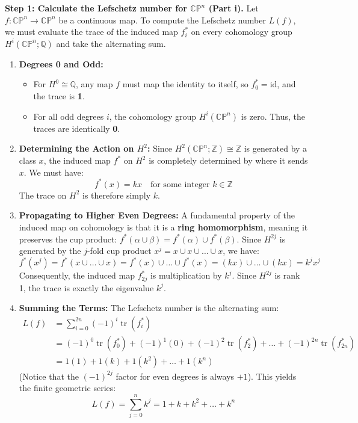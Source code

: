 \begin{solution}
\textbf{Step 1: Calculate the Lefschetz number for $\mathbb{CP}^n$ (Part i).}
Let $f: \mathbb{CP}^n \to \mathbb{CP}^n$ be a continuous map. To compute the Lefschetz number $L(f)$, we must evaluate the trace of the induced map $f^*_i$ on every cohomology group $H^i(\mathbb{CP}^n; \mathbb{Q})$ and take the alternating sum.
\begin{enumerate}
    \item \textbf{Degrees 0 and Odd:}
    \begin{itemize}
        \item For $H^0 \cong \mathbb{Q}$, any map $f$ must map the identity to itself, so $f^*_0 = \text{id}$, and the trace is \textbf{1}.
        \item For all odd degrees $i$, the cohomology group $H^i(\mathbb{CP}^n)$ is zero. Thus, the traces are identically \textbf{0}.
    \end{itemize}
    \item \textbf{Determining the Action on $H^2$:}
    Since $H^2(\mathbb{CP}^n; \mathbb{Z}) \cong \mathbb{Z}$ is generated by a class $x$, the induced map $f^*$ on $H^2$ is completely determined by where it sends $x$. We must have:
    \begin{equation*}
        f^*(x) = kx \quad \text{for some integer } k \in \mathbb{Z}
    \end{equation*}
    The trace on $H^2$ is therefore simply $k$.
    \item \textbf{Propagating to Higher Even Degrees:}
    A fundamental property of the induced map on cohomology is that it is a \textbf{ring homomorphism}, meaning it preserves the cup product: $f^*(\alpha \cup \beta) = f^*(\alpha) \cup f^*(\beta)$. Since $H^{2j}$ is generated by the $j$-fold cup product $x^j = x \cup x \cup \dots \cup x$, we have:
    \begin{equation*}
        f^*(x^j) = f^*(x \cup \dots \cup x) = f^*(x) \cup \dots \cup f^*(x) = (kx) \cup \dots \cup (kx) = k^j x^j
    \end{equation*}
    Consequently, the induced map $f^*_{2j}$ is multiplication by $k^j$. Since $H^{2j}$ is rank 1, the trace is exactly the eigenvalue $k^j$.
    \item \textbf{Summing the Terms:}
    The Lefschetz number is the alternating sum:
    \begin{align*}
        L(f) &= \sum_{i=0}^{2n} (-1)^i \operatorname{tr}(f^*_i) \\
        &= (-1)^0 \operatorname{tr}(f^*_0) + (-1)^1(0) + (-1)^2 \operatorname{tr}(f^*_2) + \dots + (-1)^{2n} \operatorname{tr}(f^*_{2n}) \\
        &= 1(1) + 1(k) + 1(k^2) + \dots + 1(k^n)
    \end{align*}
    (Notice that the $(-1)^{2j}$ factor for even degrees is always $+1$). This yields the finite geometric series:
    \begin{equation*}
        L(f) = \sum_{j=0}^n k^j = 1 + k + k^2 + \dots + k^n
    \end{equation*}
\end{enumerate}


\end{solution}
